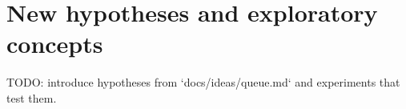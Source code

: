 \section{New hypotheses and exploratory concepts}\label{sec:new-ideas}

TODO: introduce hypotheses from `docs/ideas/queue.md` and experiments that test them.
